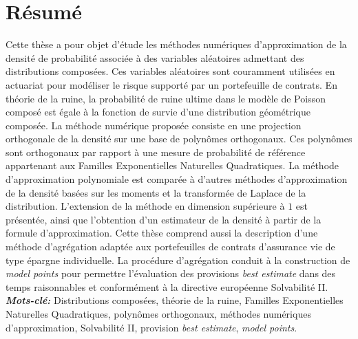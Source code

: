 \chapter*{Résumé}
 


Cette thèse a pour objet d\rq{}étude les méthodes numériques d\rq{}approximation de la densité de probabilité associée à des variables aléatoires admettant des distributions composées. Ces variables aléatoires sont couramment utilisées en actuariat pour modéliser le risque supporté par un portefeuille de contrats. En théorie de la ruine, la probabilité de ruine ultime dans le modèle de Poisson composé est égale à la fonction de survie d\rq{}une distribution géométrique composée. La méthode numérique proposée consiste en une projection orthogonale de la densité sur une base de polynômes orthogonaux. Ces polynômes sont orthogonaux par rapport à une mesure de probabilité de référence appartenant aux Familles Exponentielles Naturelles Quadratiques. La méthode d\rq{}approximation polynomiale est comparée à d\rq{}autres méthodes d\rq{}approximation de la densité basées sur les moments et la transformée de Laplace de la distribution. L\rq{}extension de la méthode en dimension supérieure à $1$ est présentée, ainsi que l\rq{}obtention d\rq{}un estimateur de la densité à partir de la formule d\rq{}approximation. Cette thèse comprend aussi la description d\rq{}une méthode d\rq{}agrégation adaptée aux portefeuilles de contrats d\rq{}assurance vie de type épargne individuelle. La procédure d\rq{}agrégation conduit à la construction de \textit{model points} pour permettre l\rq{}évaluation des provisions \textit{best estimate} dans des temps raisonnables et conformément à la directive européenne Solvabilité II.\\ 

\textbf{\textit{Mots-clé:}} Distributions composées, théorie de la ruine, Familles Exponentielles Naturelles Quadratiques, polynômes orthogonaux, méthodes numériques d\rq{}approximation, Solvabilité II, provision \textit{best estimate}, \textit{model points}.